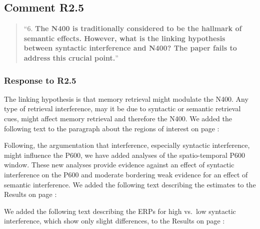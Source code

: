 \documentclass[12pt]{article}
\begin{document}
\begin{quote}
\end{quote}


\subsection*{Comment R2.5}
\begin{quote}
``6. \textbf{The N400 is traditionally considered to be the hallmark of semantic effects. However, what is the linking hypothesis between syntactic interference and N400? The paper fails to address this crucial point.}''
\end{quote}

\subsubsection*{Response to R2.5}
The linking hypothesis is that memory retrieval might modulate the N400. Any type of retrieval interference, may it be due to syntactic or semantic retrieval cues, might affect memory retrieval and therefore the N400. We added the following text to the paragraph about the regions of interest on page \pageref{why_n400}:

\begin{quote}
\end{quote}

\vspace{1em}
\noindent Following, the argumentation that interference, especially syntactic interference, might influence the P600, we have added analyses of the spatio-temporal P600 window. These new analyses provide evidence against an effect of syntactic interference on the P600 and moderate bordering weak evidence for an effect of semantic interference. We added the following text describing the estimates to the Results on page \pageref{ERP_results1}:

\begin{quote}
\end{quote}

\noindent We added the following text describing the ERPs for high vs.\ low syntactic interference, which show only slight differences, to the Results on page \pageref{ERP_results2}:
\end{document}
